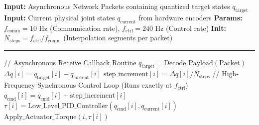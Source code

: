 \begin{algorithm}[htbp]
  \caption{Edge-Node Micro-Interpolation Safety Layer}
  \label{alg:micro_interp}
  \begin{algorithmic}[1]
    \State \textbf{Input:} Asynchronous Network Packets containing quantized target states $q_{\text{target}}$
    \State \textbf{Input:} Current physical joint states $q_{\text{current}}$ from hardware encoders
    \State \textbf{Params:} $f_{\text{comm}} = 10$ Hz (Communication rate), $f_{\text{ctrl}} = 240$ Hz (Control rate)
    \State \textbf{Init:} $N_{\text{steps}} = f_{\text{ctrl}} / f_{\text{comm}}$ (Interpolation segments per packet)
    \vspace{0.1cm}
    \hrule %
    \vspace{0.1cm}
      \State // Asynchronous Receive Callback Routine
        \State $q_{\text{target}} = \text{Decode\_Payload}(\text{Packet})$
          \State $\Delta q[i] = q_{\text{target}}[i] - q_{\text{current}}[i]$
          \State $\text{step\_increment}[i] = \Delta q[i] / N_{\text{steps}}$
        \EndFor
      \EndIf
      \State \phantom{} %
      \State // High-Frequency Synchronous Control Loop (Runs exactly at $f_{\text{ctrl}}$)
          \State $q_{\text{cmd}}[i] = q_{\text{cmd}}[i] + \text{step\_increment}[i]$
          \State $\tau[i] = \text{Low\_Level\_PID\_Controller}(q_{\text{cmd}}[i], q_{\text{current}}[i])$
          \State $\text{Apply\_Actuator\_Torque}(i, \tau[i])$
        \EndFor
      \EndIf
    \EndWhile
  \end{algorithmic}
\end{algorithm}
